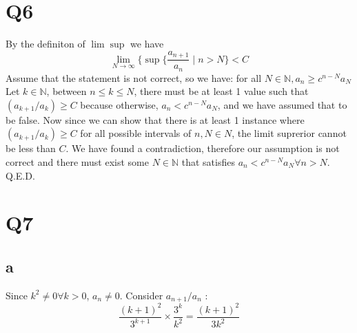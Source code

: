 \documentclass[12pt]{article}
\newcommand{\N}{\mathbb{N}}
\begin{document}
\section{Q6}
By the definiton of $\lim \sup$ we have $$\lim _{N \to \infty}\{\sup \{\frac{a_{n+1}}{a_n}\mid n>N\}< C$$
\newline
Assume that the statement is not correct, so we have: for all $N \in \N, a_n \geq c^{n-N}a_N$
\newline
Let $k \in \N$, between $n \leq k \leq N$, there must be at least 1 value such that $(a_{k+1}/a_k) \geq C$ because otherwise, $a_n < c^{n-N}a_N$, and we have assumed that to be false. Now since we can show that there is at least 1 instance where $(a_{k+1}/a_k) \geq C$ for all possible intervals of $n,N \in N$, the limit suprerior cannot be less than $C$. \lightning
\newline
We have found a contradiction, therefore our assumption is not correct and there must exist some $N \in \N$ that satisfies $a_n < c^{n-N}a_N \forall n>N$. Q.E.D.
\newpage


 \section{Q7}
\subsection{a}
Since $k^2 \neq 0 \forall k>0$, $a_n \neq 0$. Consider $a_{n+1}/a_n$ :
$$\frac{(k+1)^2}{3^{k+1}}\times \frac{3^k}{k^2} = \frac{(k+1)^2}{3k^2}$$
\end{document}
